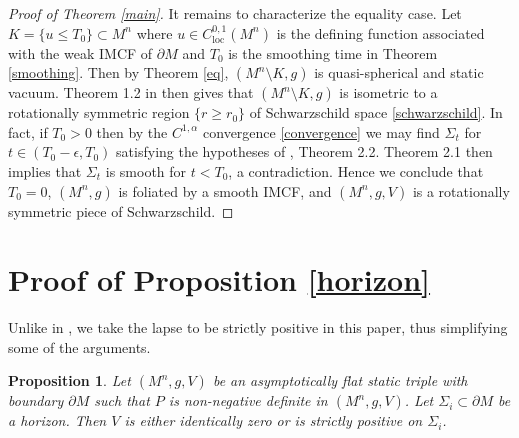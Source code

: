 \documentclass[12pt]{amsart}
\newtheorem{proposition}[theorem]{Proposition}
\theoremstyle{definition}
\numberwithin{equation}{section}
\begin{document}


\begin{proof}[Proof of Theorem \ref{main}]
It remains to characterize the equality case. Let $K = \{ u \leq T_{0}\} \subset M^{n}$ where $u \in C^{0,1}_{\text{loc}} (M^{n})$ is the defining function associated with the weak IMCF of $\partial M$ and $T_{0}$ is the smoothing time in Theorem \ref{smoothing}. Then by Theorem \ref{eq}, $(M^{n} \setminus K,g)$ is quasi-spherical and static vacuum. Theorem 1.2 in \cite{HW24a} then gives that $(M^{n} \setminus K,g)$ is isometric to a rotationally symmetric region $\{ r \geq r_{0} \}$ of Schwarzschild space \eqref{schwarzschild}. In fact, if $T_{0} > 0$ then by the $C^{1,\alpha}$ convergence \eqref{convergence} we may find $\Sigma_{t}$ for $t \in (T_{0} - \epsilon,T_{0})$ satisfying the hypotheses of \cite{HW24a}, Theorem 2.2. Theorem 2.1 then implies that $\Sigma_{t}$ is smooth for $t < T_{0}$, a contradiction. Hence we conclude that $T_{0} = 0$, $(M^{n},g)$ is foliated by a smooth IMCF, and $(M^{n},g,V)$ is a rotationally symmetric piece of Schwarzschild.
\end{proof}

\appendix
\section{Proof of Proposition \ref{horizon}}
Unlike in \cite{HMM17}, we take the lapse to be strictly positive in this paper, thus simplifying some of the arguments.
\begin{proposition}
Let $(M^{n},g,V)$ be an asymptotically flat static triple with boundary $\partial M$ such that $P$ is non-negative definite in $(M^{n},g,V)$. Let $\Sigma_{i} \subset \partial M$ be a horizon. Then $V$ is either identically zero or is strictly positive on $\Sigma_{i}$.
\end{proposition}
\end{document}
